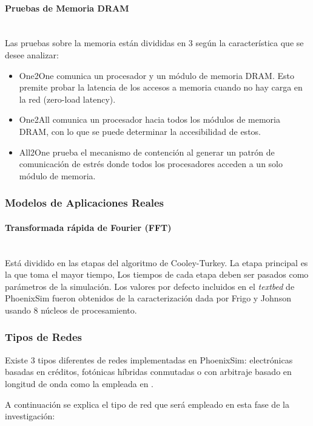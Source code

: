 \paragraph{Pruebas de Memoria DRAM}~\\
Las pruebas sobre la memoria están divididas en 3 según la característica que se desee analizar: 
\begin{itemize}
\item One2One comunica un procesador y un módulo de memoria DRAM. Esto premite probar la latencia de los accesos a memoria cuando no hay carga en la red (zero-load latency).
\item One2All comunica un procesador hacia todos los módulos de memoria DRAM, con lo que se puede determinar la accesibilidad de estos.
\item All2One prueba el mecanismo de contención al generar un patrón de comunicación de estrés donde todos los procesadores acceden a un solo módulo de memoria.
\end{itemize} 

\subsubsection{Modelos de Aplicaciones Reales}
\paragraph{Transformada rápida de Fourier (FFT)}~\\

Está dividido en las etapas del algoritmo de Cooley-Turkey. La etapa principal es la que toma el mayor tiempo, 
Los tiempos de cada etapa deben ser pasados como parámetros de la simulación. Los valores por defecto incluidos en el \textit{textbed} de PhoenixSim fueron obtenidos de la caracterización  dada por Frigo y Johnson \cite{benchFFT} usando 8 núcleos de procesamiento. 

\subsubsection{Tipos de Redes}

Existe 3 tipos diferentes de redes implementadas en PhoenixSim: electrónicas basadas en créditos,
fotónicas híbridas conmutadas o con arbitraje basado en longitud de onda como la empleada
en \cite{hendry2011time}.

A continuación se explica el tipo de red que será empleado en esta fase de la investigación:

